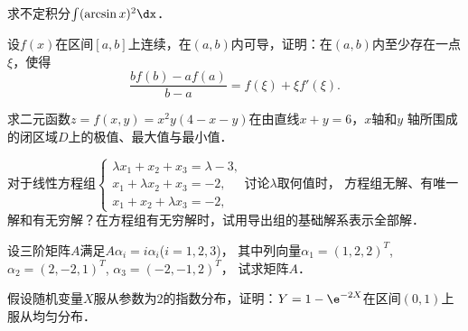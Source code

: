 \documentclass[plain,noanswer,medmath]{../../template/jnuexam}
\begin{document}






\begin{problem}
求不定积分$\int (\arcsin x)^2 \dx$．
\end{problem}









\begin{problem}
设$f(x)$在区间$[a,b]$上连续，在$(a,b)$内可导，证明：在$(a,b)$内至少存在一点$\xi$，使得
$$\frac{bf(b) - af(a)}{b - a} = f(\xi) + \xi f'(\xi).$$
\end{problem}



\begin{problem}
求二元函数$z = f(x,y) = x^2 y(4 - x - y)$在由直线$x + y = 6$，$x$轴和$y$
轴所围成的闭区域$D$上的极值、最大值与最小值．
\end{problem}



\begin{problem}
对于线性方程组$\begin{cases}
  \lambda x_1 + x_2 + x_3 = \lambda - 3, \\
  x_1 + \lambda x_2 + x_3 = - 2, \\
  x_1 + x_2 + \lambda x_3 = - 2,
\end{cases}$讨论$\lambda$取何值时，
方程组无解、有唯一解和有无穷解？在方程组有无穷解时，试用导出组的基础解系表示全部解．
\end{problem}



\begin{problem}
设三阶矩阵$A$满足$A\alpha_i = i\alpha_i$($i = 1,2,3$)，
其中列向量$\alpha_1 = (1,2,2)^T$, $\alpha_2 = (2,-2,1)^T$, $\alpha_3 = (-2,-1,2)^T$，
试求矩阵$A$．
\end{problem}






\begin{problem}
假设随机变量$X$服从参数为$2$的指数分布，证明：$Y = 1 - \e^{-2X}$在区间$(0,1)$上服从均匀分布．
\end{problem}
\end{document}
